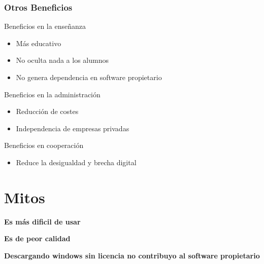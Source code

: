 \documentclass{beamer}
\begin{document}
\begin{frame}\frametitle{Otros Beneficios}
    \begin{block}{Beneficios en la enseñanza} \pause
        \begin{itemize}
            \item Más educativo \pause
            \item No oculta nada a los alumnos \pause
            \item No genera dependencia en software propietario \pause
        \end{itemize}
    \end{block}

    \begin{block}{Beneficios en la administración} \pause
        \begin{itemize}
            \item Reducción de costes \pause
            \item Independencia de empresas privadas \pause
        \end{itemize}
    \end{block}

    \begin{block}{Beneficios en cooperación} \pause
        \begin{itemize}
            \item Reduce la desigualdad y brecha digital
        \end{itemize}
    \end{block}
\end{frame}

\section{Mitos}

\begin{frame}
    \begin{center}
        \textbf{Es más dificil de usar}
    \end{center}
\end{frame}

\begin{frame}
    \begin{center}
        \textbf{Es de peor calidad}
    \end{center}
\end{frame}

\begin{frame}
    \begin{center}
        \textbf{Descargando windows sin licencia no contribuyo al software propietario}
    \end{center}
\end{frame}
\end{document}
